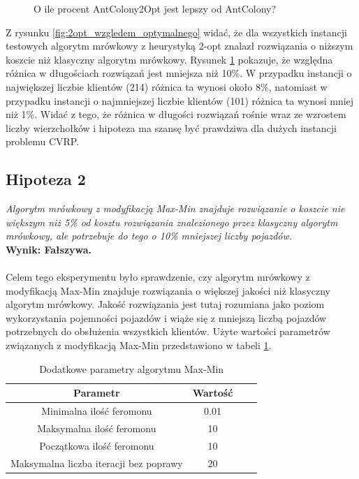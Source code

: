 \documentclass{article}
\begin{document}
\begin{figure}[H]
\begin{minipage}{0.48\textwidth}
        \label{fig:2opt_wzgledem_zwyklego}
        \caption{O ile procent AntColony2Opt jest lepszy od AntColony?}
    \end{minipage}
\end{figure}
\noindent Z rysunku \ref{fig:2opt_wzgledem_optymalnego} widać, że dla wszystkich instancji testowych algorytm mrówkowy z heurystyką 2-opt znalazł rozwiązania o niższym koszcie niż klasyczny algorytm mrówkowy. Rysunek \ref{fig:2opt_wzgledem_zwyklego} pokazuje, że względna różnica w długościach rozwiązań jest mniejsza niż 10\%. W przypadku instancji o największej liczbie klientów (214) różnica ta wynosi około 8\%, natomiast w przypadku instancji o najmniejszej liczbie klientów (101) różnica ta wynosi mniej niż 1\%. Widać z tego, że różnica w długości rozwiązań rośnie wraz ze wzrostem liczby wierzchołków i hipoteza ma szansę być prawdziwa dla dużych instancji problemu CVRP.

\subsection{Hipoteza 2}
\textit{Algorytm mrówkowy z modyfikacją Max-Min znajduje rozwiązanie o koszcie nie większym niż 5\% od kosztu rozwiązania znalezionego przez klasyczny algorytm mrówkowy, ale potrzebuje do tego o 10\% mniejszej liczby pojazdów.}
\\
\textbf{Wynik: Fałszywa.}
\\ \\
\noindent Celem tego eksperymentu było sprawdzenie, czy algorytm mrówkowy z modyfikacją Max-Min znajduje rozwiązania o większej jakości niż klasyczny algorytm mrówkowy. Jakość rozwiązania jest tutaj rozumiana jako poziom wykorzystania pojemności pojazdów i wiąże się z mniejszą liczbą pojazdów potrzebnych do obsłużenia wszystkich klientów. Użyte wartości parametrów związanych z modyfikacją Max-Min przedstawiono w tabeli \ref{tab:maxmin_params}.

\begin{table}[H]
    \centering
    \begin{tabular}{|c|c|c|c|}
        \hline
        \textbf{Parametr} & \textbf{Wartość} \\
        \hline
        Minimalna ilość feromonu & 0.01 \\
        \hline
        Maksymalna ilość feromonu & 10 \\
        \hline
        Początkowa ilość feromonu & 10 \\
        \hline
        Maksymalna liczba iteracji bez poprawy & 20 \\
        \hline
    \end{tabular}
    \caption{Dodatkowe parametry algorytmu Max-Min}
    \label{tab:maxmin_params}
\end{table}
\end{document}
